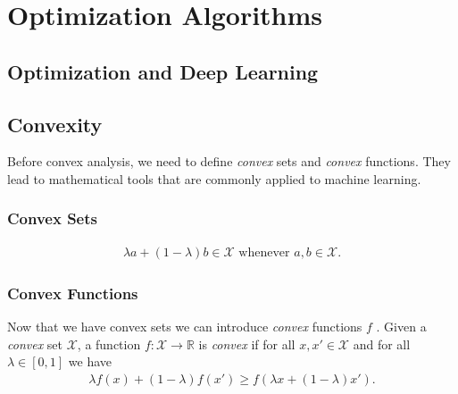 \documentclass[a4paper,12pt]{article}
\theoremstyle{definition}
\begin{document}
\section{Optimization Algorithms}

\subsection{Optimization and Deep Learning}

\subsection{Convexity}
Before convex analysis, we need to define \emph{convex} sets and \emph{convex} functions. They lead to mathematical tools that are commonly applied to machine learning.

\subsubsection*{Convex Sets}
\begin{equation*}
    \begin{aligned}
        \lambda  a + (1-\lambda)  b \in \mathcal{X} \text{ whenever } a, b \in \mathcal{X}.
    \end{aligned}
\end{equation*}

\subsubsection*{Convex Functions}

Now that we have convex sets we can introduce \emph{convex} functions $f$ . Given a \emph{convex} set $\mathcal{X}$, a function $f: \mathcal{X} \to \mathbb{R}$ is \emph{convex} if for all
$x, x' \in \mathcal{X}$ and for all $\lambda \in [0, 1]$ we have
\begin{equation*}
    \begin{aligned}
        \lambda f(x) + (1-\lambda) f(x') \geq f(\lambda x + (1-\lambda) x').
    \end{aligned}
\end{equation*}
\end{document}
